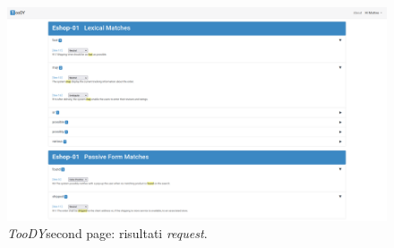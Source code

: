 \documentclass[12pt]{report}
\newcommand{\toody}{\textsl{TooDY}\xspace}
\begin{document}
\begin{figure}[H]
\centering
\includegraphics[width=1.0\textwidth]{pagina2-piena.png}
\caption{\toody \textsf{second page}: risultati \textit{request}.}
\label{fig:pagina1-login}
\end{figure}
\end{document}
